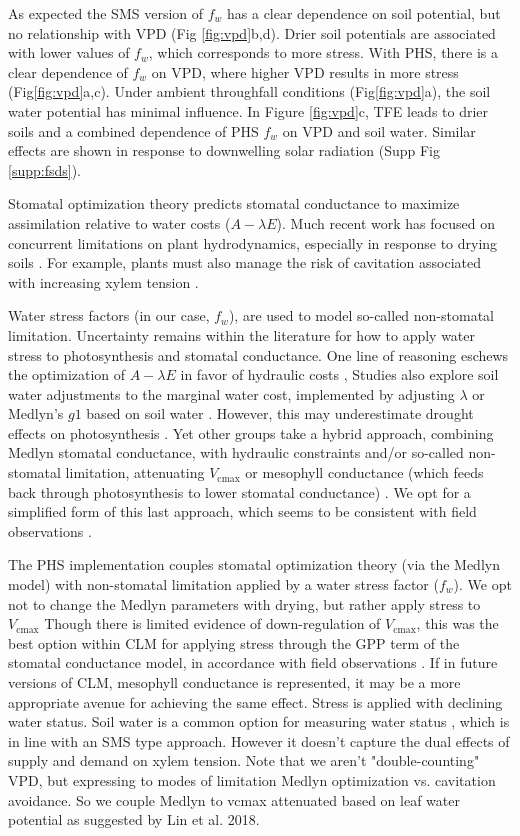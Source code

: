 \documentclass[draft,linenumbers]{agujournal}
\begin{document}
As expected the SMS version of $f_w$ has a clear dependence on soil potential, but no relationship with VPD (Fig \ref{fig:vpd}b,d). 
Drier soil potentials are associated with lower values of $f_w$, which corresponds to more stress.
With PHS, there is a clear dependence of $f_w$ on VPD, where higher VPD results in more stress (Fig\ref{fig:vpd}a,c).
Under ambient throughfall conditions (Fig\ref{fig:vpd}a), the soil water potential has minimal influence.
In Figure \ref{fig:vpd}c, TFE leads to drier soils and a combined dependence of PHS $f_w$ on VPD and soil water.
Similar effects are shown in response to downwelling solar radiation (Supp Fig \ref{supp:fsds}).

Stomatal optimization theory predicts stomatal conductance to maximize assimilation relative to water costs ($A-\lambda E$).
Much recent work has focused on concurrent limitations on plant hydrodynamics, especially in response to drying soils \citep{manzoni2013b,novick2016a,zhou2014}.
For example, plants must also manage the risk of cavitation associated with increasing xylem tension \citep{sperry1998}.

Water stress factors (in our case, $f_w$), are used to model so-called non-stomatal limitation. 
Uncertainty remains within the literature for how to apply water stress to photosynthesis and stomatal conductance.
One line of reasoning eschews the optimization of $A-\lambda E$ in favor of hydraulic costs \citep{sperry2017},
Studies also explore soil water adjustments to the marginal water cost, implemented by adjusting $\lambda$ or Medlyn's $g1$ based on soil water \citep{manzoni2013b}.
However, this may underestimate drought effects on photosynthesis \citep{zhou2013,lin2018}.
Yet other groups take a hybrid approach, combining Medlyn stomatal conductance, with hydraulic constraints and/or 
so-called non-stomatal limitation, attenuating $V_{\text{cmax}}$ or mesophyll conductance
(which feeds back through photosynthesis to lower stomatal conductance) \citep{egea2011,novick2016a}.
We opt for a simplified form of this last approach, which seems to be consistent with field observations \citep{lin2018}.

The PHS implementation couples stomatal optimization theory (via the Medlyn model) with 
non-stomatal limitation applied by a water stress factor ($f_w$).
We opt not to change the Medlyn parameters with drying, but rather apply stress to $V_{\text{cmax}}$
Though there is limited evidence of down-regulation of $V_{\text{cmax}}$, this was the best option within CLM 
for applying stress through the GPP term of the stomatal conductance model, in accordance with field observations \citep{lin2018,zhou2013}.
If in future versions of CLM, mesophyll conductance is represented, it may be a more appropriate avenue for achieving the same effect.
Stress is applied with declining water status.
Soil water is a common option for measuring water status \citep{drake2017}, which is in line with an SMS type approach.
However it doesn't capture the dual effects of supply and demand on xylem tension.
Note that we aren't "double-counting" VPD, but expressing to modes of limitation Medlyn optimization vs. cavitation avoidance.
So we couple Medlyn to vcmax attenuated based on leaf water potential as suggested by Lin et al. 2018.
\end{document}
